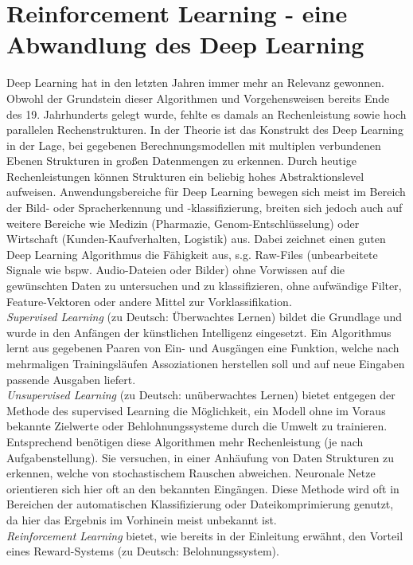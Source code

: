 \section{Reinforcement Learning - eine Abwandlung des Deep Learning}
\label{sec:rl_dl}
	Deep Learning hat in den letzten Jahren immer mehr an Relevanz gewonnen. Obwohl der Grundstein dieser Algorithmen und Vorgehensweisen bereits Ende des 19. Jahrhunderts gelegt wurde, fehlte es damals an Rechenleistung sowie hoch parallelen Rechenstrukturen. In der Theorie ist das Konstrukt des Deep Learning in der Lage, bei gegebenen Berechnungsmodellen mit multiplen verbundenen Ebenen Strukturen in großen Datenmengen zu erkennen. Durch heutige Rechenleistungen können Strukturen ein beliebig hohes Abstraktionslevel aufweisen. Anwendungsbereiche für Deep Learning bewegen sich meist im Bereich der Bild- oder Spracherkennung und -klassifizierung, breiten sich jedoch auch auf weitere Bereiche wie Medizin (Pharmazie, Genom-Entschlüsselung) oder Wirtschaft (Kunden-Kaufverhalten, Logistik) aus. Dabei zeichnet einen guten Deep Learning Algorithmus die Fähigkeit aus, s.g. Raw-Files (unbearbeitete Signale wie bspw. Audio-Dateien oder Bilder) ohne Vorwissen auf die gewünschten Daten zu untersuchen und zu klassifizieren, ohne aufwändige Filter, Feature-Vektoren oder andere Mittel zur Vorklassifikation.\\	
	\textit{Supervised Learning} (zu Deutsch: Überwachtes Lernen) bildet die Grundlage und wurde in den Anfängen der künstlichen Intelligenz eingesetzt. Ein Algorithmus lernt aus gegebenen Paaren von Ein- und Ausgängen eine Funktion, welche nach mehrmaligen Trainingsläufen Assoziationen herstellen soll und auf neue Eingaben passende Ausgaben liefert.\\
	\textit{Unsupervised Learning} (zu Deutsch: unüberwachtes Lernen) bietet entgegen der Methode des supervised Learning die Möglichkeit, ein Modell ohne im Voraus bekannte Zielwerte oder Behlohnungssysteme durch die Umwelt zu trainieren. Entsprechend benötigen diese Algorithmen mehr Rechenleistung (je nach Aufgabenstellung). Sie versuchen, in einer Anhäufung von Daten Strukturen zu erkennen, welche von stochastischem Rauschen abweichen. Neuronale Netze orientieren sich hier oft an den bekannten Eingängen. Diese Methode wird oft in Bereichen der automatischen Klassifizierung oder Dateikomprimierung genutzt, da hier das Ergebnis im Vorhinein meist unbekannt ist.\\
	\textit{Reinforcement Learning} bietet, wie bereits in der Einleitung erwähnt, den Vorteil eines Reward-Systems (zu Deutsch: Belohnungssystem).

